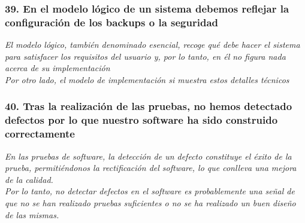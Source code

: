 \subsubsection*{39. En el modelo lógico de un sistema debemos reflejar la configuración de los backups o la seguridad}
\textit{El modelo lógico, también denominado esencial, recoge qué debe hacer el sistema para satisfacer los requisitos del usuario y, por lo tanto, en él no figura nada acerca de su implementación\\
Por otro lado, el modelo de implementación si muestra estos detalles técnicos}

\subsubsection*{40. Tras la realización de las pruebas, no hemos detectado defectos por lo que nuestro software ha sido construido correctamente}
\textit{En las pruebas de software, la detección de un defecto constituye el éxito de la prueba, permitiéndonos la rectificación del software, lo que conlleva una mejora de la calidad.\\
Por lo tanto, no detectar defectos en el software es probablemente una señal de que no se han realizado pruebas suficientes o no se ha realizado un buen diseño de las mismas.
}